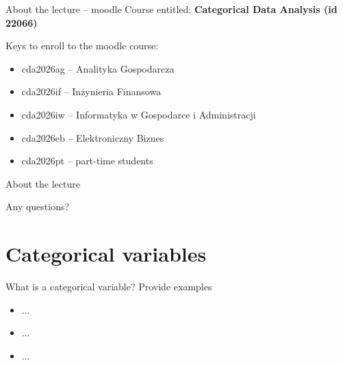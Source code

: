 \documentclass[10pt,ignorenonframetext,aspectratio=169]{beamer}
\begin{document}
\begin{frame}{About the lecture -- moodle}
Course entitled: \textbf{Categorical Data Analysis (id 22066)}

\vspace{0.5cm}

Keys to enroll to the moodle course:

    \begin{itemize}
        \item cda2026ag -- Analityka Gospodarcza
        \item cda2026if -- Inżynieria Finansowa
        \item cda2026iw -- Informatyka w Gospodarce i Administracji
        \item cda2026eb -- Elektroniczny Biznes
        \item cda2026pt -- part-time students
    \end{itemize}

\vspace{0.5cm}


\end{frame}


\begin{frame}{About the lecture}
\begin{center}
    \Large
    Any questions?
\end{center}
\end{frame}



\section{Categorical variables}

\begin{frame}{What is a categorical variable? Provide examples}
\begin{itemize}
    \item ...
    \item ...
    \item ...
\end{itemize}
\end{frame}
\end{document}
